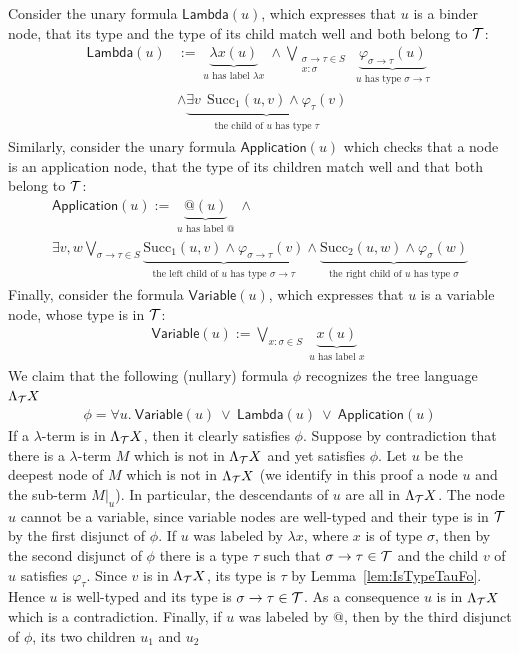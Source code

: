 Consider the unary formula $\mathsf{Lambda}(u)$, which expresses that $u$ is a binder node, that its type and the type of its child match well and both belong to ${\mathcal T}$: 
$$\begin{array}{ll}
\mathsf{Lambda}(u) &:= \underbrace{\lambda x(u)}_{\substack{\text{$u$ has label $\lambda x$}}} \wedge\bigvee_{\substack{\sigma\rightarrow\tau \in S\\x:\sigma}}  \underbrace{\varphi_{\sigma\rightarrow\tau}(u)}_{\substack{\text{$u$ has type $\sigma\rightarrow\tau$}}}  \\ & \wedge \underbrace{\exists v\ \ \mathrm{Succ}_1(u, v) \wedge \varphi_\tau (v)}_{\substack{\text{the child of $u$ has type $\tau$}}}
\end{array}$$
Similarly, consider the unary formula $\mathsf{Application}(u)$ which checks that a node is an application node, that the type of its children match well and that both belong to ${\mathcal T}$: 
$$\begin{array}{l}
\mathsf{Application}(u) := \underbrace{@(u)}_{\substack{\text{$u$ has label @}}} \wedge \\ \exists v, w \underset{\sigma\rightarrow\tau \in S}{\bigvee}  \underbrace{\mathrm{Succ}_1(u, v) \wedge \varphi_{\sigma\rightarrow\tau} (v)}_{\substack{\text{the left child of $u$ has type $\sigma\rightarrow\tau$}}} \wedge \underbrace{\mathrm{Succ}_2(u, w) \wedge \varphi_{\sigma} (w)}_{\substack{\text{the right child of $u$ has type $\sigma$}}}
\end{array}$$
Finally, consider the formula $\mathsf{Variable}(u)$, which expresses that $u$ is a variable node, whose type is in ${\mathcal T}$:
\begin{align*}
\mathsf{Variable}(u) :=  \bigvee_{x:\sigma\in S}\underbrace{x(u)}_{\substack{\text{$u$ has label $x$}}} 
\end{align*}  
We claim that the following (nullary) formula $\phi$ recognizes the tree language $\Lambda_{{\mathcal T}} X$
\begin{align*}
\phi = \forall u.\ \mathsf{Variable}(u)\ \vee\ \mathsf{Lambda}(u)\ \vee\  \mathsf{Application}(u)
\end{align*}
If a $\lambda$-term is in $\Lambda_{{\mathcal T}} X$, then it clearly satisfies $\phi$. Suppose by contradiction that there is a $\lambda$-term $M$ which is not in $\Lambda_{{\mathcal T}} X$ and yet satisfies $\phi$. Let $u$  be the deepest node of $M$ which is not in $\Lambda_{{\mathcal T}} X$ (we identify in this proof a node $u$ and the sub-term $M|_u$). In particular, the descendants of $u$ are all in $\Lambda_{{\mathcal T}} X$. The node $u$ cannot be a variable, since variable nodes are well-typed and their type is in ${\mathcal T}$ by the first disjunct of $\phi$.  If $u$ was labeled by $\lambda x$, where $x$ is of type $\sigma$, then by the second disjunct of $\phi$ there is a type $\tau$ such that $\sigma\rightarrow\tau\in {\mathcal T}$ and the child $v$ of $u$  satisfies $\varphi_\tau$. Since $v$ is in $\Lambda_{{\mathcal T}} X$, its type is $\tau$ by Lemma~\ref{lem:IsTypeTauFo}. Hence $u$ is well-typed and its type is $\sigma\rightarrow\tau\in {\mathcal T}$. As a consequence $u$ is in $\Lambda_{{\mathcal T}} X$ which is a contradiction.  Finally, if $u$ was labeled by $@$, then by the third disjunct of $\phi$, its two children $u_1$ and $u_2$
